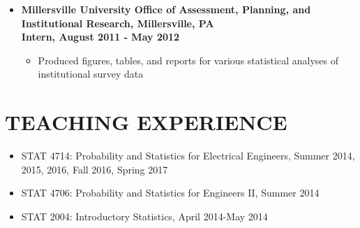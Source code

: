 \documentclass[10pt]{article}
\begin{document}
\begin{itemize}
\item[] \textbf{Millersville University Office of Assessment, Planning, and Institutional Research, Millersville, PA \\
Intern, August 2011 - May 2012}
\begin{itemize}
\item Produced figures, tables, and reports for various statistical analyses of institutional survey data
\end{itemize}


%
%
\end{itemize}


\section*{TEACHING EXPERIENCE}
\begin{itemize}
\item STAT 4714: Probability and Statistics for Electrical Engineers, Summer 2014, 2015, 2016, Fall 2016, Spring 2017
\item STAT 4706: Probability and Statistics for Engineers II, Summer 2014
\item STAT 2004: Introductory Statistics, April 2014-May 2014
\end{itemize}
\end{document}
